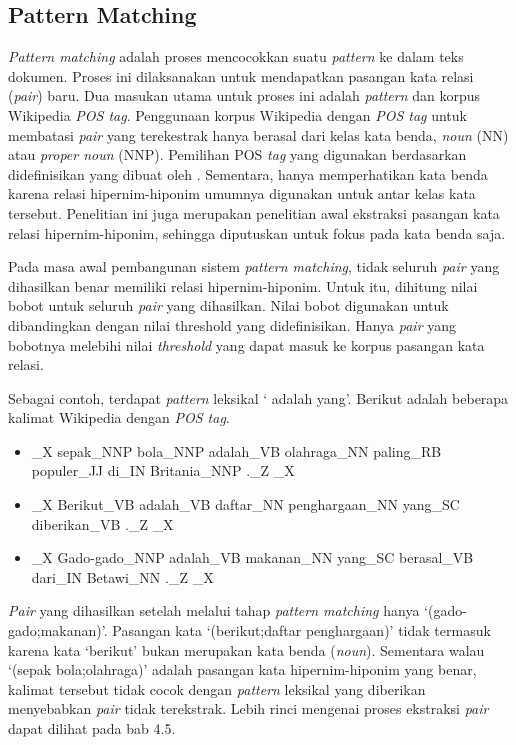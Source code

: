 \subsection{Pattern Matching}
\textit{Pattern matching} adalah proses mencocokkan suatu \textit{pattern} ke dalam teks dokumen. Proses ini dilaksanakan untuk mendapatkan pasangan kata relasi (\textit{pair}) baru. Dua masukan utama untuk proses ini adalah \textit{pattern} dan korpus Wikipedia \textit{POS tag}. Penggunaan korpus Wikipedia dengan \textit{POS tag} untuk membatasi \textit{pair} yang terekestrak hanya berasal dari kelas kata benda, \textit{noun} (NN) atau \textit{proper noun} (NNP). Pemilihan POS \textit{tag} yang digunakan berdasarkan didefinisikan yang dibuat oleh \cite{dinakaramani2014designing}. Sementara, hanya memperhatikan kata benda karena relasi hipernim-hiponim umumnya digunakan untuk antar kelas kata tersebut. Penelitian ini juga merupakan penelitian awal ekstraksi pasangan kata relasi hipernim-hiponim, sehingga diputuskan untuk fokus pada kata benda saja. 

Pada masa awal pembangunan sistem \textit{pattern matching}, tidak seluruh \textit{pair} yang dihasilkan benar memiliki relasi hipernim-hiponim. Untuk itu, dihitung nilai bobot untuk seluruh \textit{pair} yang dihasilkan. Nilai bobot digunakan untuk dibandingkan dengan nilai threshold yang didefinisikan. Hanya \textit{pair} yang bobotnya melebihi nilai \textit{threshold} yang dapat masuk ke korpus pasangan kata relasi.

Sebagai contoh, terdapat \textit{pattern} leksikal `{\tagHyponym} adalah {\tagHypernym} yang'. Berikut adalah beberapa kalimat Wikipedia dengan \textit{POS tag}.

\begin{itemize}
  \item {\tagStart}\_X sepak\_NNP bola\_NNP adalah\_VB olahraga\_NN paling\_RB populer\_JJ di\_IN Britania\_NNP .\_Z {\tagEnd}\_X
  \item {\tagStart}\_X Berikut\_VB adalah\_VB daftar\_NN penghargaan\_NN yang\_SC diberikan\_VB .\_Z {\tagEnd}\_X
  \item {\tagStart}\_X Gado-gado\_NNP adalah\_VB makanan\_NN yang\_SC berasal\_VB dari\_IN Betawi\_NN .\_Z {\tagEnd}\_X
\end{itemize}

\textit{Pair} yang dihasilkan setelah melalui tahap \textit{pattern matching} hanya `(gado-gado;makanan)'. Pasangan kata `(berikut;daftar penghargaan)' tidak termasuk karena kata `berikut' bukan merupakan kata benda (\textit{noun}). Sementara walau `(sepak bola;olahraga)' adalah pasangan kata hipernim-hiponim yang benar, kalimat tersebut tidak cocok dengan \textit{pattern} leksikal yang diberikan menyebabkan \textit{pair} tidak terekstrak. Lebih rinci mengenai proses ekstraksi \textit{pair} dapat dilihat pada bab 4.5.

